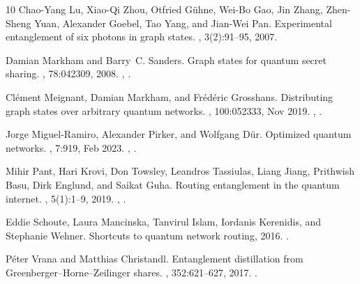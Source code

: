 \documentclass[10pt,a4paper]{article}
\begin{document}
\begin{thebibliography}{10}
Chao-Yang Lu, Xiao-Qi Zhou, Otfried G{\"u}hne, Wei-Bo Gao, Jin Zhang,
  Zhen-Sheng Yuan, Alexander Goebel, Tao Yang, and Jian-Wei Pan.
\newblock Experimental entanglement of six photons in graph states.
, 3(2):91--95, 2007.

Damian Markham and Barry~C. Sanders.
\newblock Graph states for quantum secret sharing.
, 78:042309, 2008.
\newblock \href {https://arxiv.org/abs/0808.1532} {},
  \href {https://doi.org/10.1103/PhysRevA.78.042309}
  {}.

Cl\'ement Meignant, Damian Markham, and Fr\'ed\'eric Grosshans.
\newblock Distributing graph states over arbitrary quantum networks.
, 100:052333, Nov 2019.
\newblock \href {https://arxiv.org/abs/1811.05445} {},
  \href {https://doi.org/10.1103/PhysRevA.100.052333}
  {}.

Jorge Miguel-Ramiro, Alexander Pirker, and Wolfgang D{\"u}r.
\newblock Optimized quantum networks.
, 7:919, Feb 2023.
\newblock \href {https://arxiv.org/abs/2107.10275} {},
  \href {https://doi.org/10.22331/q-2023-02-09-919}
  {}.

Mihir Pant, Hari Krovi, Don Towsley, Leandros Tassiulas, Liang Jiang, Prithwish
  Basu, Dirk Englund, and Saikat Guha.
\newblock Routing entanglement in the quantum internet.
, 5(1):1--9, 2019.
\newblock \href {https://arxiv.org/abs/1708.07142} {},
  \href {https://doi.org/10.1038/s41534-019-0139-x}
  {}.

Eddie Schoute, Laura Mancinska, Tanvirul Islam, Iordanis Kerenidis, and
  Stephanie Wehner.
\newblock Shortcuts to quantum network routing, 2016.
\newblock \href {https://arxiv.org/abs/1610.05238} {}.

P{\'e}ter Vrana and Matthias Christandl.
\newblock Entanglement distillation from {Greenberger--Horne--Zeilinger}
  shares.
, 352:621--627, 2017.
\newblock \href {https://arxiv.org/abs/1603.03964} {}.

\end{thebibliography}
\end{document}
